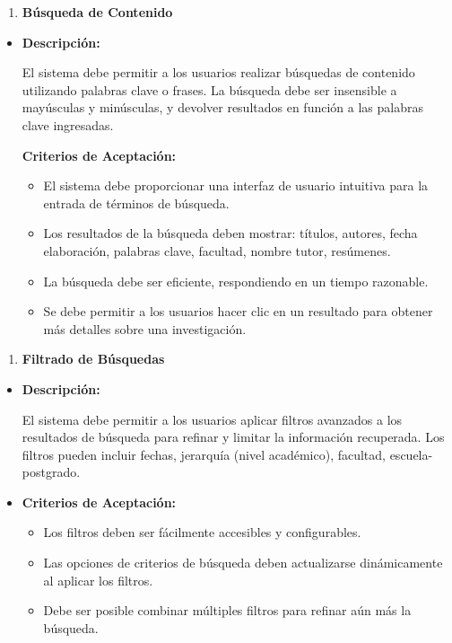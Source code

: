 \documentclass[
  12pt,
  openany]{book}
\providecommand{\tightlist}{%
  \setlength{\itemsep}{0pt}\setlength{\parskip}{0pt}}
\begin{document}
\begin{enumerate}
\def\labelenumi{\arabic{enumi}.}
\setcounter{enumi}{1}
\tightlist
\item
  \textbf{Búsqueda de Contenido}
\end{enumerate}

\begin{itemize}
\item
  \textbf{Descripción:}

  El sistema debe permitir a los usuarios realizar búsquedas de contenido utilizando palabras clave o frases. La búsqueda debe ser insensible a mayúsculas y minúsculas, y devolver resultados en función a las palabras clave ingresadas.

  \textbf{Criterios de Aceptación:}

  \begin{itemize}
  \tightlist
  \item
    El sistema debe proporcionar una interfaz de usuario intuitiva para la entrada de términos de búsqueda.
  \item
    Los resultados de la búsqueda deben mostrar: títulos, autores, fecha elaboración, palabras clave, facultad, nombre tutor, resúmenes.
  \item
    La búsqueda debe ser eficiente, respondiendo en un tiempo razonable.
  \item
    Se debe permitir a los usuarios hacer clic en un resultado para obtener más detalles sobre una investigación.
  \end{itemize}
\end{itemize}

\begin{enumerate}
\def\labelenumi{\arabic{enumi}.}
\setcounter{enumi}{2}
\tightlist
\item
  \textbf{Filtrado de Búsquedas}
\end{enumerate}

\begin{itemize}
\item
  \textbf{Descripción:}

  El sistema debe permitir a los usuarios aplicar filtros avanzados a los resultados de búsqueda para refinar y limitar la información recuperada. Los filtros pueden incluir fechas, jerarquía (nivel académico), facultad, escuela-postgrado.
\item
  \textbf{Criterios de Aceptación:}

  \begin{itemize}
  \item
    Los filtros deben ser fácilmente accesibles y configurables.
  \item
    Las opciones de criterios de búsqueda deben actualizarse dinámicamente al aplicar los filtros.
  \item
    Debe ser posible combinar múltiples filtros para refinar aún más la búsqueda.
  \end{itemize}
\end{itemize}
\end{document}
